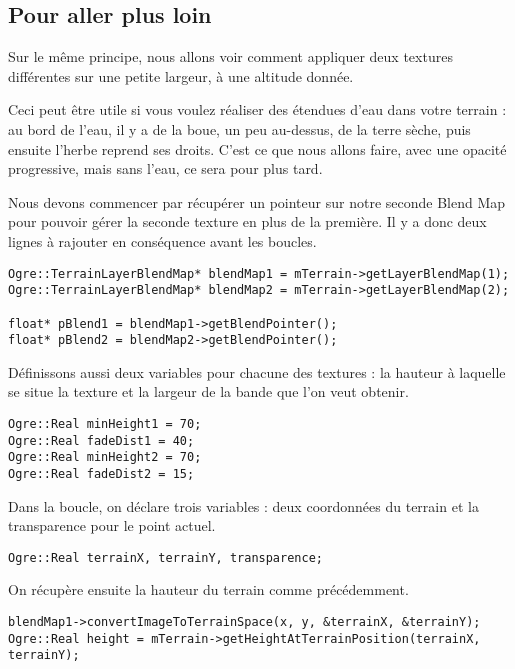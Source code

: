 \documentclass[10pt,a4paper]{report}
\begin{document}
\subsection{Pour aller plus loin}

Sur le m\^eme principe, nous allons voir comment appliquer deux textures diff\'erentes sur une petite largeur, \`a une altitude donn\'ee.

Ceci peut \^etre utile si vous voulez r\'ealiser des \'etendues d'eau dans votre terrain : au bord de l'eau, il y a de la boue, un peu au-dessus, de la terre s\`eche, puis ensuite l'herbe reprend ses droits. C'est ce que nous allons faire, avec une opacit\'e progressive, mais sans l'eau, ce sera pour plus tard.

Nous devons commencer par r\'ecup\'erer un pointeur sur notre seconde Blend Map pour pouvoir g\'erer la seconde texture en plus de la premi\`ere. Il y a donc deux lignes \`a rajouter en cons\'equence avant les boucles.




\begin{lstlisting}[caption={R\'ecup\'eration des Blend Map pour le premier et le second terrain}]
Ogre::TerrainLayerBlendMap* blendMap1 = mTerrain->getLayerBlendMap(1);
Ogre::TerrainLayerBlendMap* blendMap2 = mTerrain->getLayerBlendMap(2);

float* pBlend1 = blendMap1->getBlendPointer();
float* pBlend2 = blendMap2->getBlendPointer();
\end{lstlisting}

D\'efinissons aussi deux variables pour chacune des textures : la hauteur \`a laquelle se situe la texture et la largeur de la bande que l'on veut obtenir.

\begin{lstlisting}[caption={}]
Ogre::Real minHeight1 = 70;
Ogre::Real fadeDist1 = 40;
Ogre::Real minHeight2 = 70;
Ogre::Real fadeDist2 = 15;
\end{lstlisting}

Dans la boucle, on d\'eclare trois variables : deux coordonn\'ees du terrain et la transparence pour le point actuel.

\begin{lstlisting}[caption={}]
Ogre::Real terrainX, terrainY, transparence;
\end{lstlisting}

On r\'ecup\`ere ensuite la hauteur du terrain comme pr\'ec\'edemment.

\begin{lstlisting}[caption={}]
blendMap1->convertImageToTerrainSpace(x, y, &terrainX, &terrainY);
Ogre::Real height = mTerrain->getHeightAtTerrainPosition(terrainX, terrainY);
\end{lstlisting}
\end{document}

